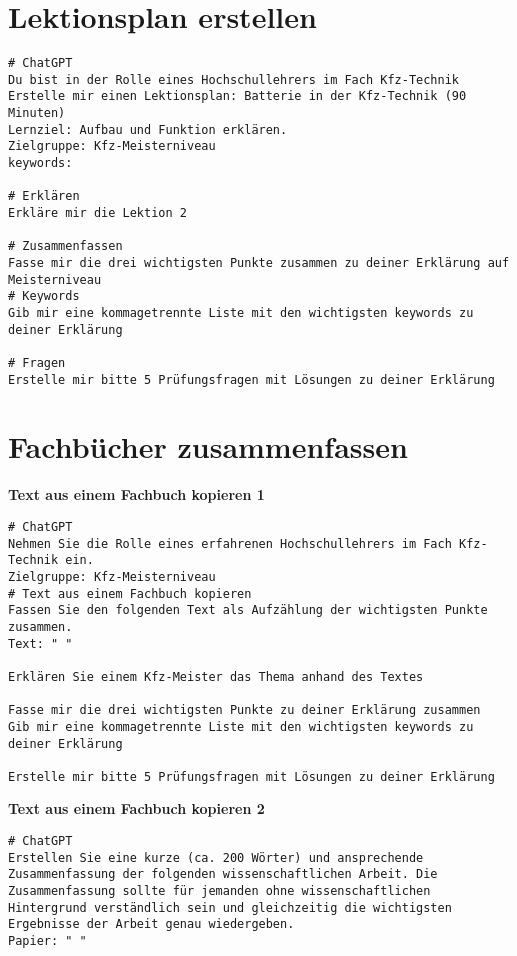 \documentclass[12pt,a4paper]{scrartcl}
\begin{document}
\hypertarget{lektionsplan-erstellen}{%
\section{Lektionsplan erstellen}\label{lektionsplan-erstellen}}

\begin{lstlisting}
# ChatGPT
Du bist in der Rolle eines Hochschullehrers im Fach Kfz-Technik
Erstelle mir einen Lektionsplan: Batterie in der Kfz-Technik (90 Minuten)
Lernziel: Aufbau und Funktion erklären. 
Zielgruppe: Kfz-Meisterniveau
keywords: 

# Erklären
Erkläre mir die Lektion 2

# Zusammenfassen
Fasse mir die drei wichtigsten Punkte zusammen zu deiner Erklärung auf Meisterniveau
# Keywords
Gib mir eine kommagetrennte Liste mit den wichtigsten keywords zu deiner Erklärung

# Fragen
Erstelle mir bitte 5 Prüfungsfragen mit Lösungen zu deiner Erklärung
\end{lstlisting}

\hypertarget{fachbuxfccher-zusammenfassen}{%
\section{Fachbücher zusammenfassen}\label{fachbuxfccher-zusammenfassen}}

\textbf{Text aus einem Fachbuch kopieren 1}

\begin{lstlisting}
# ChatGPT
Nehmen Sie die Rolle eines erfahrenen Hochschullehrers im Fach Kfz-Technik ein.
Zielgruppe: Kfz-Meisterniveau
# Text aus einem Fachbuch kopieren
Fassen Sie den folgenden Text als Aufzählung der wichtigsten Punkte zusammen. 
Text: " "

Erklären Sie einem Kfz-Meister das Thema anhand des Textes

Fasse mir die drei wichtigsten Punkte zu deiner Erklärung zusammen
Gib mir eine kommagetrennte Liste mit den wichtigsten keywords zu deiner Erklärung

Erstelle mir bitte 5 Prüfungsfragen mit Lösungen zu deiner Erklärung
\end{lstlisting}

\textbf{Text aus einem Fachbuch kopieren 2}

\begin{lstlisting}
# ChatGPT
Erstellen Sie eine kurze (ca. 200 Wörter) und ansprechende Zusammenfassung der folgenden wissenschaftlichen Arbeit. Die Zusammenfassung sollte für jemanden ohne wissenschaftlichen Hintergrund verständlich sein und gleichzeitig die wichtigsten Ergebnisse der Arbeit genau wiedergeben. 
Papier: " "
\end{lstlisting}
\end{document}
